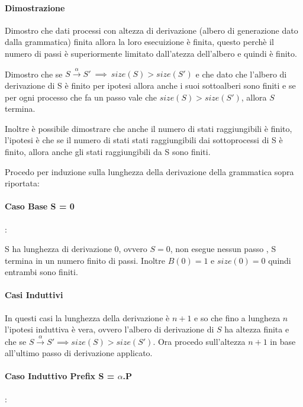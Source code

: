 \documentclass{article}
\newcommand{\passo}{\xrightarrow{\alpha}}
\begin{document}
\paragraph{Dimostrazione} %

Dimostro che dati processi con altezza di derivazione (albero di generazione dato dalla grammatica) finita allora la loro esecuizione è finita, questo perchè il numero di passi è superiormente limitato dall'atezza dell'albero e quindi è finito. 

Dimostro che se $ S \passo  S' ~ \implies ~ size(S) > size(S') $ e che dato che l'albero di derivazione di S è finito per ipotesi allora anche i suoi sottoalberi sono finiti e se per ogni processo che fa un passo vale che $size(S)>size(S')$, allora $S$ termina.

Inoltre è possibile dimostrare che anche il numero di stati raggiungibili è finito, l'ipotesi è che se il numero di stati stati raggiungibili dai sottoprocessi di S è finito, allora anche gli stati raggiungibili da S sono finiti.

Procedo per induzione sulla lunghezza della derivazione della grammatica sopra riportata:

\paragraph{Caso Base S = 0}: 

S ha lunghezza di derivazione 0, ovvero $S=0$, non esegue nessun passo%
, S termina in un numero finito di passi. Inoltre $B(0) = 1$ e $size(0) = 0$ quindi entrambi sono finiti.

\paragraph{Casi Induttivi }

In questi casi la lunghezza della derivazione è $n+1$ e so che fino a lungheza $n$ l'ipotesi induttiva è vera, ovvero l'albero di derivazione di $S$ ha altezza finita e che se $S \passo S' \implies size(S)>size(S')$. Ora procedo sull'altezza $n+1$ in base all'ultimo passo di derivazione applicato.

\paragraph{Caso Induttivo Prefix S = $\alpha$.P}:
\end{document}

